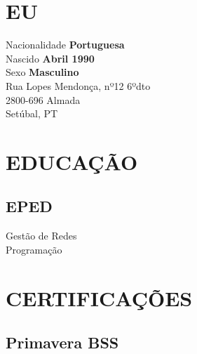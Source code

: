 \documentclass[letterpaper]{deedy-resume} %
\begin{document}

\lastupdated %



\begin{minipage}[t]{0.33\textwidth}

\section{EU}

Nacionalidade \textbf{Portuguesa}\\
Nascido \textbf{Abril 1990}\\
Sexo \textbf{Masculino}\\

Rua Lopes Mendonça, nº12 6ºdto\\
2800-696 Almada\\
Setúbal, PT\\

\sectionspace

\section{EDUCAÇÃO}
\subsection{EPED}
Gestão de Redes\\
Programação

\sectionspace

\section{CERTIFICAÇÕES}
\subsection{Primavera BSS}

\end{minipage}
\end{document}
